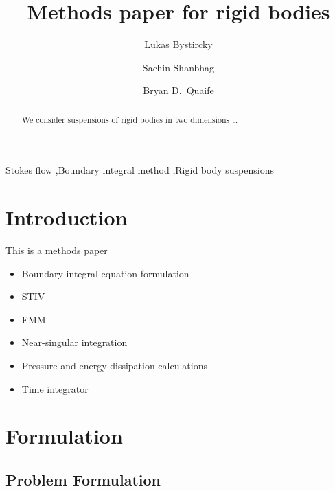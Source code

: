 \documentclass[preprint, 10pt]{elsarticle}
\begin{document}
\title{Methods paper for rigid bodies}

\author[Lukas]{Lukas Bystircky}
\author[Lukas]{Sachin Shanbhag}
\author[Bryan]{Bryan D.~Quaife}
\address[Lukas]{Department of Scientific Computing, Florida State University, Tallahassee, FL, 32306.}
\address[Bryan]{Department of Scientific Computing and Geophysical Fluid Dynamics Institute, Florida State University, Tallahassee, FL, 32306.}

\begin{abstract} 
We consider suspensions of rigid bodies in two dimensions \ldots
\end{abstract}

\begin{keyword}
  Stokes flow \sep Boundary integral method \sep Rigid body suspensions 
\end{keyword}

\maketitle





\section{Introduction\label{s:intro}}


This is a methods paper
\begin{itemize}
  \item Boundary integral equation formulation
  \item STIV
  \item FMM
  \item Near-singular integration
  \item Pressure and energy dissipation calculations
  \item Time integrator
\end{itemize}




\section{Formulation\label{s:formulation}} 

\subsection{Problem Formulation}
\end{document}
